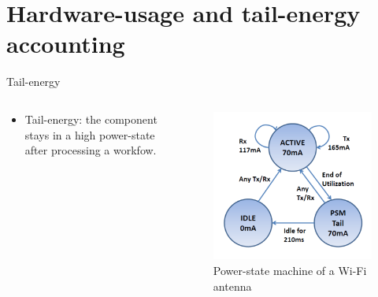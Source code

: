 \section{Hardware-usage and tail-energy accounting}
\begin{frame}{Tail-energy}
\begin{columns}
\begin{column}{0.5\textwidth}
\begin{itemize}
\item Tail-energy: the component stays in a high power-state \alert{after} processing a workfow.
\end{itemize}
\end{column}
\pause
\begin{column}{0.5\textwidth}
\begin{figure}
	\centering
	\includegraphics[width=\textwidth]{figures/wifi_statemachine.png} 
	\caption{Power-state machine of a Wi-Fi antenna}
\end{figure}
\end{column}
\end{columns}
\end{frame}
